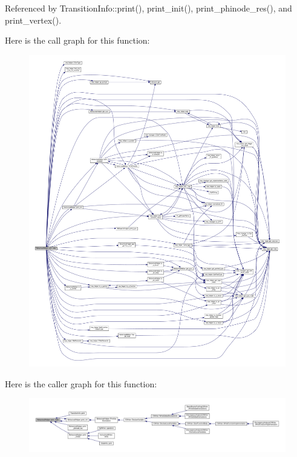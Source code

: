 Referenced by Transition\+Info\+::print(), print\+\_\+init(), print\+\_\+phinode\+\_\+res(), and print\+\_\+vertex().

Here is the call graph for this function\+:
\nopagebreak
\begin{figure}[H]
\begin{center}
\leavevmode
\includegraphics[width=350pt]{dd/db2/classBehavioralHelper_a63abf8a92b3fe000ca65a322df34bbd4_cgraph}
\end{center}
\end{figure}
Here is the caller graph for this function\+:
\nopagebreak
\begin{figure}[H]
\begin{center}
\leavevmode
\includegraphics[width=350pt]{dd/db2/classBehavioralHelper_a63abf8a92b3fe000ca65a322df34bbd4_icgraph}
\end{center}
\end{figure}
\mbox{\label{classBehavioralHelper_add86ad429c5bcbc95fc8a294b0fb8174}} 
